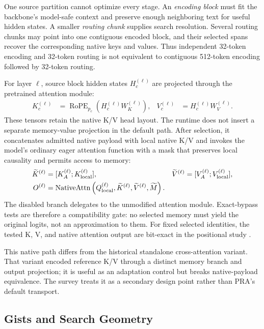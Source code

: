 One source partition cannot optimize every stage. An \emph{encoding block} must fit the
backbone's model-safe context and preserve enough neighboring text for useful hidden states.
A smaller \emph{routing chunk} supplies search resolution. Several routing chunks may point
into one contiguous encoded block, and their selected spans recover the corresponding native
keys and values. Thus independent 32-token encoding and 32-token routing is not equivalent to
contiguous 512-token encoding followed by 32-token routing.

For layer $\ell$, source block hidden states $H^{(\ell)}_c$ are projected through the
pretrained attention module:
\begin{align}
K^{(\ell)}_c &= \operatorname{RoPE}_{p_c}
  \left(H^{(\ell)}_c W^{(\ell)}_K\right), &
V^{(\ell)}_c &= H^{(\ell)}_c W^{(\ell)}_V.
\end{align}
These tensors retain the native K/V head layout. The runtime does not insert a separate
memory-value projection in the default path. After selection, it concatenates admitted
native payload with local native K/V and invokes the model's ordinary eager attention
function with a mask that preserves local causality and permits access to memory:
\begin{align}
\widetilde K^{(\ell)}&=[K^{(\ell)}_{A};K^{(\ell)}_{\rm local}], &
\widetilde V^{(\ell)}&=[V^{(\ell)}_{A};V^{(\ell)}_{\rm local}],\\
O^{(\ell)}&=\operatorname{NativeAttn}
  \left(Q^{(\ell)}_{\rm local},\widetilde K^{(\ell)},
  \widetilde V^{(\ell)},\widetilde M\right).
\end{align}
The disabled branch delegates to the unmodified attention module. Exact-bypass tests are
therefore a compatibility gate: no selected memory must yield the original logits, not an
approximation to them. For fixed selected identities, the tested K, V, and native attention
output are bit-exact in the positional study \citep{simao2026praPosition}.

This native path differs from the historical standalone cross-attention variant. That
variant encoded reference K/V through a distinct memory branch and output projection; it is
useful as an adaptation control but breaks native-payload equivalence. The survey treats it
as a secondary design point rather than PRA's default transport.

\subsection{Gists and Search Geometry}

